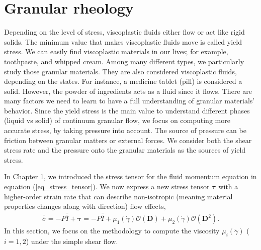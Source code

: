 \section{Granular rheology}
Depending on the level of stress, viscoplastic fluids either flow or act like rigid solids. The minimum value that makes viscoplastic fluids move is called yield stress. 
We can easily find viscoplastic materials in our lives; for example, toothpaste, and whipped cream. 
Among many different types, we particularly study those granular materials. They are also considered viscoplastic fluids, depending on the states. For instance, a medicine tablet (pill) is considered a solid. However, the powder of ingredients acts as a fluid since it flows. 
There are many factors we need to learn to have a full understanding of granular materials' behavior.
Since the yield stress is the main value to understand different phases (liquid vs solid) of continuum granular flow, we focus on computing more accurate stress, by taking pressure into account. The source of pressure can be friction between granular matters or external forces.  
We consider both the shear stress rate and the pressure onto the granular materials as the sources of yield stress. 
\par
In Chapter 1, we introduced the stress tensor for the fluid momentum equation in equation (\ref{eq_stress_tensor}). 
We now express a new stress tensor $\bm \tau$ with a higher-order strain rate that can describe non-isotropic (meaning material properties changes along with direction) flow effects,
\begin{align}
  \bar{\bar{\sigma}}
    = -P \bar{\bar{I}}  + \bm{\tau}
    =  -P \bar{\bar{I}}  
    + \mu_1(\dot{\gamma}) \mathcal{O}({\bm D})
    + \mu_2(\dot{\gamma}) \mathcal{O}({\bm D^2}).
  \end{align}
In this section, we focus on the methodology to compute the viscosity $\mu_i ({\dot{\gamma}})$ ($i = 1,2$) under the simple shear flow. 


